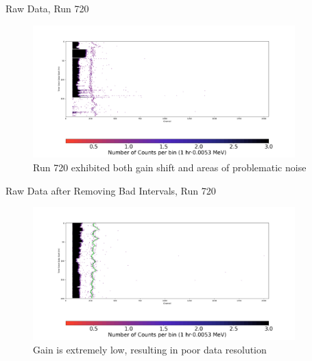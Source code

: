 \documentclass[aspectratio=169]{beamer}
\begin{document}
\begin{frame}{Raw Data, Run 720}
    \begin{figure}
        \begin{center}
            \includegraphics[width=0.9\textwidth]
            {assets/720/RD.png}
            \caption{Run 720 exhibited both gain shift and areas of problematic noise}
        \end{center}
    \end{figure}
\end{frame}

\begin{frame}{Raw Data after Removing Bad Intervals, Run 720}
    \begin{figure}
        \begin{center}
            \includegraphics[width=0.9\textwidth]
            {assets/720/RDP.png}
            \caption{Gain is extremely low, resulting in poor data resolution}
        \end{center}
    \end{figure}
\end{frame}
\end{document}
